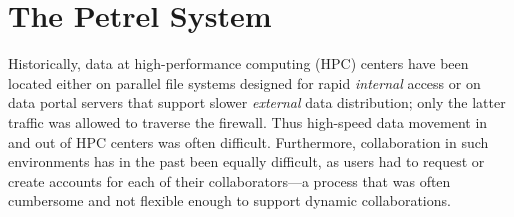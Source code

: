 \documentclass[sigconf]{acmart}
\begin{document}
%
%
%
%
%
%











\section{The Petrel System}

Historically,
data at high-performance computing (HPC) centers have been located either on parallel file systems
designed for rapid \emph{internal} access or on data portal servers that support slower \emph{external} data distribution;
only the latter traffic was allowed to traverse the firewall.
Thus 
high-speed data movement in and out of HPC centers was often difficult.
Furthermore, collaboration in such environments has in the past been equally difficult, as 
users had to request or create accounts for each of their collaborators---a process
that was often cumbersome and not flexible enough to support dynamic collaborations. 
 
\end{document}
